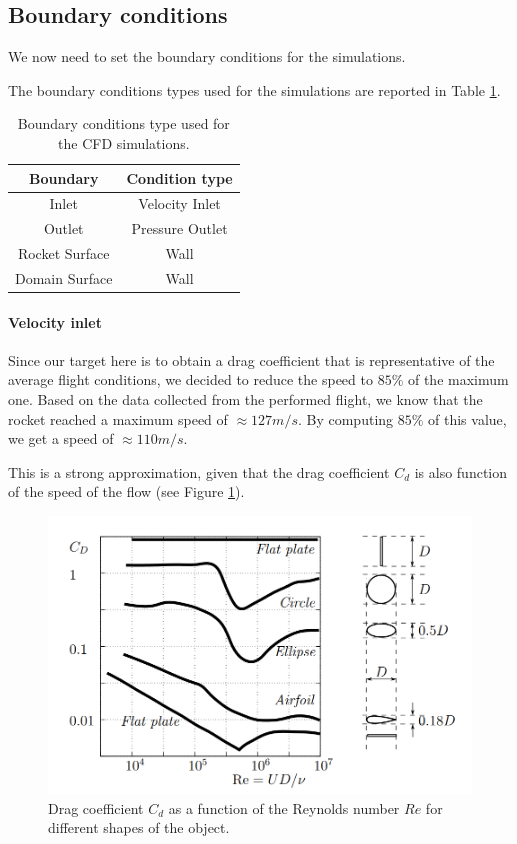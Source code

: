 \subsection{Boundary conditions}
\label{subsubsec:boundary_conditions}

We now need to set the boundary conditions for the simulations.

The boundary conditions types used for the simulations are reported in Table \ref{tab:boundary_conditions}.

\begin{table}[H]
    \centering
    \begin{tabular}{|c|c|}
        \hline
        \textbf{Boundary} & \textbf{Condition type} \\
        \hline
        Inlet             & Velocity Inlet          \\
        Outlet            & Pressure Outlet         \\
        Rocket Surface    & Wall                    \\
        Domain Surface    & Wall                    \\
        \hline
    \end{tabular}
    \caption{Boundary conditions type used for the CFD simulations.}
    \label{tab:boundary_conditions}
\end{table}


\paragraph{Velocity inlet}

Since our target here is to obtain a drag coefficient that is representative of the average flight conditions, we decided to reduce the speed to $85\%$ of the maximum one.
Based on the data collected from the performed flight, we know that the rocket reached a maximum speed of $\approx 127m/s$.
By computing $85\%$ of this value, we get a speed of $\approx 110m/s$.

This is a strong approximation, given that the drag coefficient $C_d$ is also function of the speed of the flow (see Figure \ref{fig:velocity_inlet}).

\begin{figure}[H]
    \centering
    \includegraphics[width=.7\textwidth]{img/Cd_vs_Re.png}
    \caption{Drag coefficient $C_d$ as a function of the Reynolds number $Re$ for different shapes of the object.}
    \label{fig:velocity_inlet}
\end{figure}

